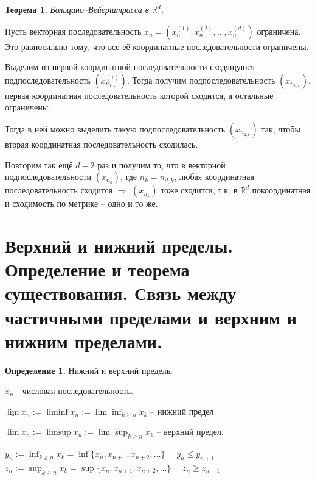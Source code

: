\documentclass[12pt,letterpaper]{report}
\makeatletter
\newtheorem*{theorem-non}{Теорема}
\theoremstyle{definition}
\newtheorem*{conj}{Определение}
\renewenvironment{proof}[1][\proofname]{%
   \par\pushQED{\qed}\normalfont%
   \topsep6\p@\@plus6\p@\relax
   \trivlist\item[\hskip\labelsep\bfseries#1\@addpunct{.}]%
   \ignorespaces
}{%
   \popQED\endtrivlist\@endpefalse
}
\makeatother
\begin{document}
    \begin{theorem-non}
    Больцано–Вейерштрасса в $\mathbb{R}^d$.
    \end{theorem-non}
    \begin{proof}
    Пусть векторная последовательность
    $x_n = (x_n^{(1)}, x_n^{(2)}, \dots, x_n^{(d)})$ ограничена.
    Это равносильно тому, что все её координатные последовательности
    ограничены.
    
    Выделим из первой координатной последовательности сходящуюся
    подпоследовательность $(x_{n_{1, k}}^{(1)})$. Тогда получим
    подпоследовательность $(x_{n_{1, k}})$, первая координатная
    последовательность которой сходится, а остальные ограничены.
    
    Тогда в ней можно выделить такую подпоследовательность
    $(x_{n_{2, k}})$ так, чтобы вторая координатная последовательность
    сходилась.
    
    Повторим так ещё $d - 2$ раз и получим то, что в векторной 
    подпоследовательности $(x_{n_{k}})$, где $n_k = n_{d, k}$, 
    любая координатная последовательность сходится $\Rightarrow$
    $(x_{n_{k}})$ тоже сходится, т.к. в $\mathbb{R}^d$ покоординатная и
    сходимость по метрике -- одно и то же.
    
    \end{proof}
    
    
    \section{Верхний и нижний пределы. Определение и
    теорема существования. Связь между частичными пределами и  
    верхним и нижним пределами.}
    
    \begin{conj}
    Нижний и верхний пределы
    \end{conj}
    $x_n$ - числовая последовательность.
    
    $\underline{\lim} x_n := \liminf x_n := \lim \inf_{k \geq n} x_k$ -- 
    нижний предел.
    
    $\overline{\lim} x_n := \limsup x_n := \lim \sup_{k \geq n} x_k$ -- 
    верхний предел.
    
    $y_n := \inf_{k \geq n} x_k = \inf\{x_n, x_{n+1}, x_{n+2}, \dots\}$
    $\quad y_n \leq y_{n+1}$\\
    $z_n := \sup_{k \geq n} x_k = \sup\{x_n, x_{n+1}, x_{n+2}, \dots\}$
    $\quad z_n \geq z_{n+1}$
    
\end{document}
